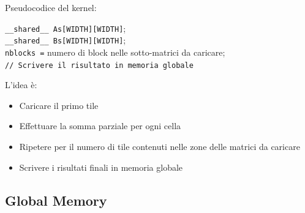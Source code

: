 Pseudocodice del kernel:
\begin{center}
	\begin{minipage}{.9\textwidth}
		\begin{tcolorbox}[
			colback=white,
			sharp corners,
			boxrule=.3mm,
			left=20pt,
			top=0pt,
			bottom=0pt,
			colbacktitle=white,
			coltitle=black
			]
			\LinesNumbered
			\begin{algorithm}[H]
				\SetAlgoNoEnd
				\texttt{\_\_shared\_\_ As[WIDTH][WIDTH]}; \\
				\texttt{\_\_shared\_\_ Bs[WIDTH][WIDTH]}; \\
				\texttt{nblocks =} numero di block nelle sotto-matrici da caricare; \\
				\texttt{// Scrivere il risultato in memoria globale}
			\end{algorithm}
		\end{tcolorbox}
	\end{minipage}
\end{center}

L'idea è: 
\begin{itemize}
	\item Caricare il primo tile
	
	\item Effettuare la somma parziale per ogni cella
	
	 \item Ripetere per il numero di tile contenuti nelle zone delle matrici da caricare
	 
	 \item Scrivere i risultati finali in memoria globale
\end{itemize}

\subsection{Global Memory}

